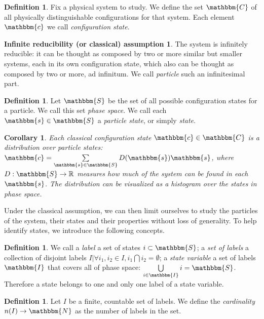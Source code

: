 \documentclass[aps,pra,10pt,twocolumn,floatfix,nofootinbib]{revtex4-1}
\newtheorem{cor}[thm]{Corollary}
\theoremstyle{definition}
\newtheorem{defn}[thm]{Definition}
\newtheorem*{assump1}{Infinite reducibility (or classical) assumption}
\begin{document}
\begin{defn}\label{statedef}
Fix a physical system to study. We define the set $\mathbbm{C}$ of all physically distinguishable configurations for that system. Each element $\mathbbm{c}$ we call \emph{configuration state}.
\end{defn}

\begin{assump1}\label{classical}
The system is infinitely reducible: it can be thought as composed by two or more similar but smaller systems, each in its own configuration state, which also can be thought as composed by two or more, ad infinitum. We call \emph{particle} such an infinitesimal part.
\end{assump1}

\begin{defn}\label{classicalPhaseSpace}
Let $\mathbbm{S}$ be the set of all possible configuration states for a particle. We call this set \emph{phase space}. We call each $\mathbbm{s} \in \mathbbm{S}$ a \emph{particle state}, or simply \emph{state}.
\end{defn}

\begin{cor}\label{classicalDistribution}
Each classical configuration state $\mathbbm{c} \in \mathbbm{C}$ is a distribution over particle states: $\mathbbm{c}=\sum\limits_{\mathbbm{s} \in \mathbbm{S}} D(\mathbbm{s}) \mathbbm{s}$, where $D:\mathbbm{S}\rightarrow\mathbb{R}$ measures how much of the system can be found in each $\mathbbm{s}$. The distribution can be visualized as a histogram over the states in phase space.
\end{cor}

Under the classical assumption, we can then limit ourselves to study the particles of the system, their states and their properties without loss of generality. To help identify states, we introduce the following concepts.

\begin{defn}\label{label}
We call a \emph{label} a set of states $i\subset\mathbbm{S}$; a \emph{set of labels} a collection of disjoint labels $I | \forall i_1,i_2\in I, i_1\bigcap i_2 = \emptyset$; a \emph{state variable} a set of labels $\mathbbm{I}$ that covers all of phase space: $\bigcup\limits_{i \in \mathbbm{I}}i=\mathbbm{S}$. Therefore a state belongs to one and only one label of a state variable.
\end{defn}

\begin{defn}\label{discreteCardinality}
Let $I$ be a finite, countable set of labels. We define the \emph{cardinality} $n(I) \rightarrow \mathbbm{N}$ as the number of labels in the set.
\end{defn}
\end{document}
